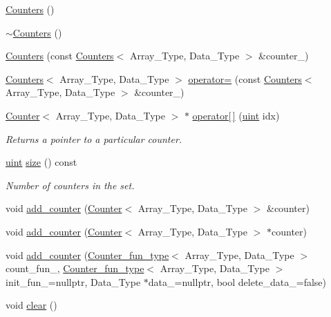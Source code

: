 \begin{DoxyCompactItemize}
\item 
\hyperlink{classbarry_1_1_counters_adebe3273f50b48637efe1b3e73e0dcc6}{Counters} ()
\item 
\hyperlink{classbarry_1_1_counters_acc54ef822eea4170573142ecb189318d}{$\sim$\+Counters} ()
\item 
\hyperlink{classbarry_1_1_counters_a178c0267c1f52a36e10e9d257a21a224}{Counters} (const \hyperlink{classbarry_1_1_counters}{Counters}$<$ Array\+\_\+\+Type, Data\+\_\+\+Type $>$ \&counter\+\_\+)
\item 
\hyperlink{classbarry_1_1_counters}{Counters}$<$ Array\+\_\+\+Type, Data\+\_\+\+Type $>$ \hyperlink{classbarry_1_1_counters_a0edeb22b0b1640f7ada1ef47a30ac486}{operator=} (const \hyperlink{classbarry_1_1_counters}{Counters}$<$ Array\+\_\+\+Type, Data\+\_\+\+Type $>$ \&counter\+\_\+)
\item 
\hyperlink{classbarry_1_1_counter}{Counter}$<$ Array\+\_\+\+Type, Data\+\_\+\+Type $>$ $\ast$ \hyperlink{classbarry_1_1_counters_a9c3ff72b5e24a299e3c1aecad0ea5eb2}{operator\mbox{[}$\,$\mbox{]}} (\hyperlink{namespacebarry_a11dfc53ddb4672278319aa04f1e09a6c}{uint} idx)
\begin{DoxyCompactList}\small\item\em Returns a pointer to a particular counter. \end{DoxyCompactList}\item 
\hyperlink{namespacebarry_a11dfc53ddb4672278319aa04f1e09a6c}{uint} \hyperlink{classbarry_1_1_counters_aa70f3d91d0f69ff8f4887930efaa0411}{size} () const
\begin{DoxyCompactList}\small\item\em Number of counters in the set. \end{DoxyCompactList}\item 
void \hyperlink{classbarry_1_1_counters_a5b5dafc7a3e0eedae400457f69937613}{add\+\_\+counter} (\hyperlink{classbarry_1_1_counter}{Counter}$<$ Array\+\_\+\+Type, Data\+\_\+\+Type $>$ \&counter)
\item 
void \hyperlink{classbarry_1_1_counters_a74f054aa9ea64103c2d9f79f115777d4}{add\+\_\+counter} (\hyperlink{classbarry_1_1_counter}{Counter}$<$ Array\+\_\+\+Type, Data\+\_\+\+Type $>$ $\ast$counter)
\item 
void \hyperlink{classbarry_1_1_counters_a4ee47504f9c76892c6028619e6b138ee}{add\+\_\+counter} (\hyperlink{namespacebarry_abaaae3200da8e4b7faac3c04fe9c3081}{Counter\+\_\+fun\+\_\+type}$<$ Array\+\_\+\+Type, Data\+\_\+\+Type $>$ count\+\_\+fun\+\_\+, \hyperlink{namespacebarry_abaaae3200da8e4b7faac3c04fe9c3081}{Counter\+\_\+fun\+\_\+type}$<$ Array\+\_\+\+Type, Data\+\_\+\+Type $>$ init\+\_\+fun\+\_\+=nullptr, Data\+\_\+\+Type $\ast$data\+\_\+=nullptr, bool delete\+\_\+data\+\_\+=false)
\item 
void \hyperlink{classbarry_1_1_counters_ae4635c154970a13ce88d2e982fe7dab3}{clear} ()
\end{DoxyCompactItemize}


